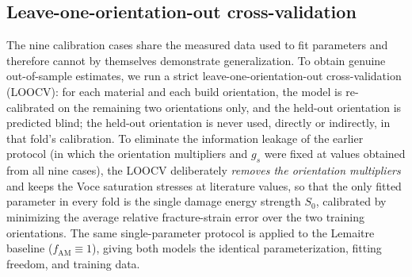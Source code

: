 \documentclass[twocolumn]{sagej}
\begin{document}
\subsection{Leave-one-orientation-out cross-validation}
\label{sec:loocv}

The nine calibration cases share the measured data used to fit parameters and therefore cannot by themselves demonstrate generalization. To obtain genuine out-of-sample estimates, we run a strict leave-one-orientation-out cross-validation (LOOCV): for each material and each build orientation, the model is re-calibrated on the remaining two orientations only, and the held-out orientation is predicted blind; the held-out orientation is never used, directly or indirectly, in that fold's calibration. To eliminate the information leakage of the earlier protocol (in which the orientation multipliers and $g_s$ were fixed at values obtained from all nine cases), the LOOCV deliberately \emph{removes the orientation multipliers} and keeps the Voce saturation stresses at literature values, so that the only fitted parameter in every fold is the single damage energy strength $S_0$, calibrated by minimizing the average relative fracture-strain error over the two training orientations. The same single-parameter protocol is applied to the Lemaitre baseline ($f_{\mathrm{AM}} \equiv 1$), giving both models the identical parameterization, fitting freedom, and training data.
\end{document}
